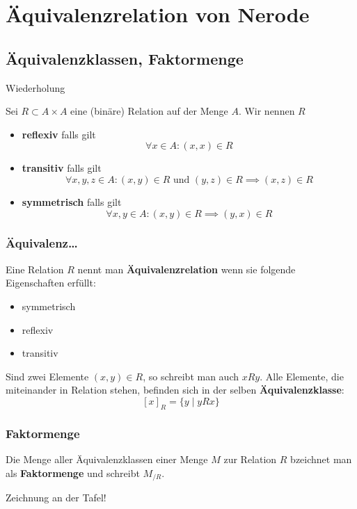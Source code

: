

\section{Äquivalenzrelation von Nerode}
\subsection{Äquivalenzklassen, Faktormenge}
\begin{frame}{Wiederholung}
	\begin{Definition}
		Sei $R \subset A \times A$ eine (binäre) Relation auf der Menge $A$. Wir nennen $R$
		\begin{itemize}
			\item \textbf{reflexiv} falls gilt $$\forall x \in A: (x,x) \in R$$
			\item \textbf{transitiv} falls gilt $$\forall x,y,z \in A: (x,y) \in R \text{ und } (y,z) \in R \implies (x,z) \in R$$
			\item \textbf{symmetrisch} falls gilt $$\forall x,y \in A: (x,y) \in R \implies (y,x) \in R$$
		\end{itemize}
	\end{Definition}
\end{frame}
\begin{frame}
	\frametitle{Äquivalenz\dots}
	\begin{Definition}
		Eine Relation $R$ nennt man \textbf{Äquivalenzrelation} wenn sie folgende Eigenschaften erfüllt:
		\begin{itemize}
			\item symmetrisch
			\item reflexiv
			\item transitiv
		\end{itemize}
	\end{Definition}
	\pause
	\begin{Definition}
		Sind zwei Elemente $(x,y) \in R$, so schreibt man auch $xRy$. Alle Elemente, die miteinander in Relation stehen, befinden sich in der selben \textbf{Äquivalenzklasse}: $$[x]_R = \{ y \mid yRx \}$$
	\end{Definition}
\end{frame}

\begin{frame}
	\frametitle{Faktormenge}
	\begin{Definition}
		Die Menge aller Äquivalenzklassen einer Menge $M$ zur Relation $R$ bzeichnet man als \textbf{Faktormenge} und schreibt $M_{/R}$.
	\end{Definition}
	\pause
	Zeichnung an der Tafel!
\end{frame}

